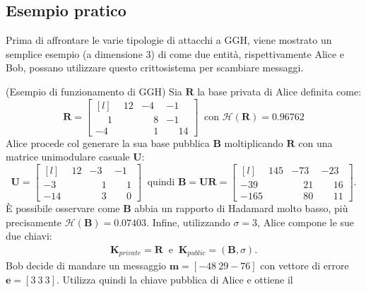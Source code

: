 \subsection{Esempio pratico}
\label{exp:GGH}
Prima di affrontare le varie tipologie di attacchi a GGH, viene mostrato un semplice esempio
(a dimensione 3) di come due entità, rispettivamente Alice e Bob, possano utilizzare questo
crittosistema per scambiare messaggi.
\begin{exmp} (Esempio di funzionamento di GGH)
Sia $\mathbf{R}$ la base privata di Alice definita come:
\begin{equation*}
    \mathbf{R} =
    \begin{bmatrix*}[l]
        \phantom{-}12 & -4 & -1\\
        \phantom{-}1 & \phantom{-}8 & -1\\
        -4 & \phantom{-}1 & \phantom{-}14
    \end{bmatrix*}
    \ \text{ con } \mathcal{H}(\mathbf{R}) = 0.96762
\end{equation*}
Alice procede col generare la sua base pubblica $\mathbf{B}$ moltiplicando $\mathbf{R}$ con una matrice
unimodulare casuale $\mathbf{U}$:
\begin{equation*}
    \mathbf{U} =
    \begin{bmatrix*}[l]
        \phantom{-}12 & -3 & -1\\
        -3 & \phantom{-}1 & \phantom{-}1\\
        -14 & \phantom{-}3 & \phantom{-}0
    \end{bmatrix*}
    \ \text{ quindi } \mathbf{B}=\mathbf{U}\mathbf{R} =
    \begin{bmatrix*}[l]
        \phantom{-}145 & -73 & -23\\
        -39  & \phantom{-}21 & \phantom{-}16\\
        -165  & \phantom{-}80 & \phantom{-}11
    \end{bmatrix*}.
\end{equation*}
È possibile osservare come $\mathbf{B}$ abbia un rapporto di Hadamard molto basso, più 
precisamente $\mathcal{H}(\mathbf{B}) = 0.07403$. Infine, utilizzando $\sigma = 3$, 
Alice compone le sue due chiavi:
\begin{gather*}
    \mathbf{K}_{private} = \mathbf{R}
    \ \text{ e } \  
    \mathbf{K}_{public} = (\mathbf{B}, \sigma).
\end{gather*}
Bob decide di mandare un messaggio $\mathbf{m} = [-48 \ 29 -76]$ con vettore di errore
$\mathbf{e} = [3 \ 3 \ 3]$. Utilizza quindi la chiave pubblica di Alice e ottiene il 

\end{exmp}
